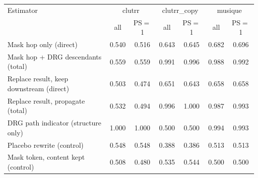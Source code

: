 \begin{tabular}{lcccccc}
\toprule
Estimator & \multicolumn{2}{c}{clutrr} & \multicolumn{2}{c}{clutrr\_copy} & \multicolumn{2}{c}{musique} \\
 & all & PS$=$1 & all & PS$=$1 & all & PS$=$1 \\
\midrule
Mask hop only (direct) & 0.540 & 0.516 & 0.643 & 0.645 & 0.682 & 0.696 \\
Mask hop + DRG descendants (total) & 0.559 & 0.559 & 0.991 & 0.996 & 0.988 & 0.992 \\
Replace result, keep downstream (direct) & 0.503 & 0.474 & 0.651 & 0.643 & 0.658 & 0.658 \\
Replace result, propagate (total) & 0.532 & 0.494 & 0.996 & 1.000 & 0.987 & 0.993 \\
DRG path indicator (structure only) & 1.000 & 1.000 & 0.500 & 0.500 & 0.994 & 0.993 \\
Placebo rewrite (control) & 0.548 & 0.548 & 0.388 & 0.386 & 0.513 & 0.513 \\
Mask token, content kept (control) & 0.508 & 0.480 & 0.535 & 0.544 & 0.500 & 0.500 \\
\bottomrule
\end{tabular}
